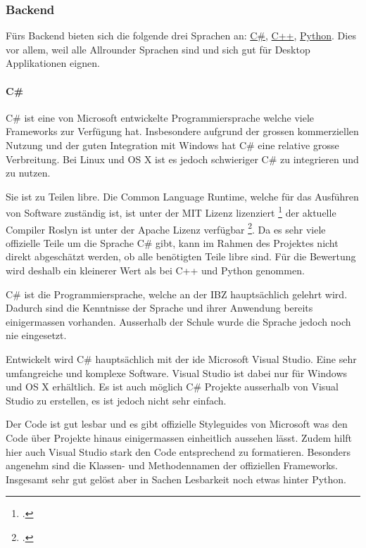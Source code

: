 \subsubsection{Backend}
\label{sec:org992057e}

Fürs Backend bieten sich die folgende drei Sprachen an: \hyperref[sec:orgf14b096]{C\#}, \hyperref[sec:org5dffd72]{C++}, \hyperref[sec:org24cf9d5]{Python}.
Dies vor allem, weil alle Allrounder Sprachen sind und sich gut für Desktop
Applikationen eignen.

\paragraph{C\#}
\label{sec:orgf14b096}

C\# ist eine von Microsoft entwickelte Programmiersprache welche viele
Frameworks zur Verfügung hat. Insbesondere aufgrund der grossen kommerziellen
Nutzung und der guten Integration mit Windows hat C\# eine relative grosse
Verbreitung. Bei Linux und OS X ist es jedoch schwieriger C\# zu integrieren und
zu nutzen.

Sie ist zu Teilen \gls{libre}. Die Common Language Runtime, welche für das
Ausführen von Software zuständig ist, ist unter der MIT Lizenz lizenziert
\footcite{csharp} der aktuelle Compiler Roslyn ist unter der Apache Lizenz
verfügbar \footcite{roslyn}. Da es sehr viele offizielle Teile um die Sprache C\#
gibt, kann im Rahmen des Projektes nicht direkt abgeschätzt werden, ob alle
benötigten Teile \gls{libre} sind. Für die Bewertung wird deshalb ein kleinerer
Wert als bei C++ und Python genommen.

C\# ist die Programmiersprache, welche an der IBZ hauptsächlich gelehrt wird.
Dadurch sind die Kenntnisse der Sprache und ihrer Anwendung bereits
einigermassen vorhanden. Ausserhalb der Schule wurde die Sprache jedoch noch nie
eingesetzt.

Entwickelt wird C\# hauptsächlich mit der \gls{ide} Microsoft Visual Studio.
Eine sehr umfangreiche und komplexe Software. Visual Studio ist dabei nur für
Windows und OS X erhältlich. Es ist auch möglich C\# Projekte ausserhalb von
Visual Studio zu erstellen, es ist jedoch nicht sehr einfach.

Der Code ist gut lesbar und es gibt offizielle Styleguides von Microsoft was
den Code über Projekte hinaus einigermassen einheitlich aussehen lässt. Zudem
hilft hier auch Visual Studio stark den Code entsprechend zu formatieren.
Besonders angenehm sind die Klassen- und Methodennamen der offiziellen
Frameworks. Insgesamt sehr gut gelöst aber in Sachen Lesbarkeit noch etwas
hinter Python.

